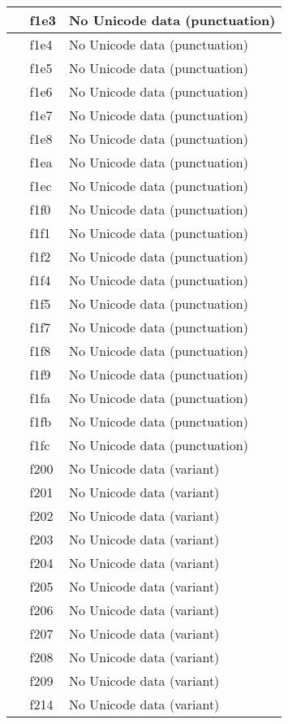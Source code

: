 \documentclass[12pt,letterpaper,openany]{book}
\begin{document}
\begin{center}
\begin{supertabular}{|m{0.25in}|m{0.5in}|m{4in}|}
 & f1e3 & No Unicode data (punctuation)\\\hline
 & f1e4 & No Unicode data (punctuation)\\\hline
 & f1e5 & No Unicode data (punctuation)\\\hline
 & f1e6 & No Unicode data (punctuation)\\\hline
 & f1e7 & No Unicode data (punctuation)\\\hline
 & f1e8 & No Unicode data (punctuation)\\\hline
 & f1ea & No Unicode data (punctuation)\\\hline
 & f1ec & No Unicode data (punctuation)\\\hline
 & f1f0 & No Unicode data (punctuation)\\\hline
 & f1f1 & No Unicode data (punctuation)\\\hline
 & f1f2 & No Unicode data (punctuation)\\\hline
 & f1f4 & No Unicode data (punctuation)\\\hline
 & f1f5 & No Unicode data (punctuation)\\\hline
 & f1f7 & No Unicode data (punctuation)\\\hline
 & f1f8 & No Unicode data (punctuation)\\\hline
 & f1f9 & No Unicode data (punctuation)\\\hline
 & f1fa & No Unicode data (punctuation)\\\hline
 & f1fb & No Unicode data (punctuation)\\\hline
 & f1fc & No Unicode data (punctuation)\\\hline
 & f200 & No Unicode data (variant)\\\hline
 & f201 & No Unicode data (variant)\\\hline
 & f202 & No Unicode data (variant)\\\hline
 & f203 & No Unicode data (variant)\\\hline
 & f204 & No Unicode data (variant)\\\hline
 & f205 & No Unicode data (variant)\\\hline
 & f206 & No Unicode data (variant)\\\hline
 & f207 & No Unicode data (variant)\\\hline
 & f208 & No Unicode data (variant)\\\hline
 & f209 & No Unicode data (variant)\\\hline
 & f214 & No Unicode data (variant)\\\hline

\end{supertabular}
\end{center}
\end{document}
